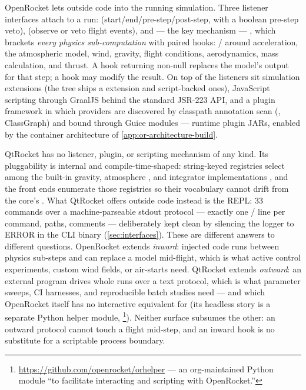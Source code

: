 OpenRocket lets outside code into the running simulation. Three listener interfaces attach
to a run:  (start/end/pre-step/post-step, with a boolean pre-step
veto),  (observe or veto flight events), and --- the key
mechanism --- , which brackets \emph{every physics
sub-computation} with paired hooks: / around acceleration, the
atmospheric model, wind, gravity, flight conditions, aerodynamics, mass calculation, and
thrust. A  hook returning non-null replaces the model's output for that step; a
 hook may modify the result. On top of the listeners sit simulation extensions
(the tree ships a  extension and script-backed ones), JavaScript scripting through GraalJS behind the
standard JSR-223 API, and a plugin framework in which providers are discovered by classpath
annotation scan (, ClassGraph) and bound through Guice modules --- runtime
plugin JARs, enabled by the container architecture of
\cref{app:or-architecture-build}.

QtRocket has no listener, plugin, or scripting mechanism of any kind. Its pluggability is
internal and compile-time-shaped: string-keyed registries select among the built-in
gravity, atmosphere , and integrator implementations
, and the front ends enumerate those registries so their
vocabulary cannot drift from the core's . What QtRocket
offers outside code instead is the REPL: 33 commands over a machine-parseable stdout
protocol --- exactly one / line per command,  paths, \code{\#}
comments  --- deliberately kept clean by silencing the logger to
ERROR in the CLI binary  (\cref{sec:interfaces}). These are
different answers to different questions. OpenRocket extends \emph{inward}: injected code
runs between physics sub-steps and can replace a model mid-flight, which is what active
control experiments, custom wind fields, or air-starts need. QtRocket extends
\emph{outward}: an external program drives whole runs over a text protocol, which is what
parameter sweeps, CI harnesses, and reproducible batch studies need --- and which
OpenRocket itself has no interactive equivalent for (its headless story is a separate
Python helper module, \footnote{\url{https://github.com/openrocket/orhelper}
--- an org-maintained Python module ``to facilitate interacting and scripting with
OpenRocket.''}).
Neither surface subsumes the other: an outward protocol cannot touch a flight mid-step, and
an inward hook is no substitute for a scriptable process boundary.

